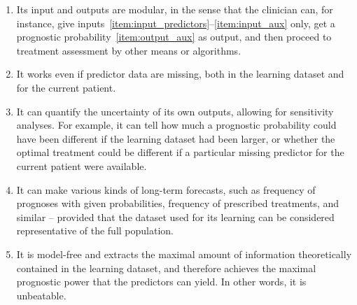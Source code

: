 \documentclass[utf8]{FrontiersinHarvard_mod} %
\renewcommand*{\|}[1][]{\nonscript\:#1\vert\nonscript\:\mathopen{}}
\begin{document}
\begin{enumerate}
\item\label{item:feat_modular_inout} Its input and outputs are modular, in the sense that the clinician can, for instance, give inputs~\ref{item:input_predictors}--\ref{item:input_aux} only, get a prognostic probability~\ref{item:output_aux} as output, and then proceed to treatment assessment by other means or algorithms.

\item\label{item:feat_imputation} It works even if predictor data are missing, both in the learning dataset and for the current patient.

\item\label{item:feat_uncertainty} It can quantify the uncertainty of its own outputs, allowing for sensitivity analyses. For example, it can tell how much a prognostic probability could have been different if the learning dataset had been larger, or whether the optimal treatment could be different if a particular missing predictor for the current patient were available.

\item\label{item:feat_forecast} It can make various kinds of long-term forecasts, such as frequency of prognoses with given probabilities, frequency of prescribed treatments, and similar -- provided that the dataset used for its learning can be considered representative of the full population.

\item\label{item:feat_unbeatable} It is model-free and extracts the maximal amount of information theoretically contained in the learning dataset, and therefore achieves the maximal prognostic power that the predictors can yield. In other words, it is unbeatable.

\end{enumerate}
\end{document}
